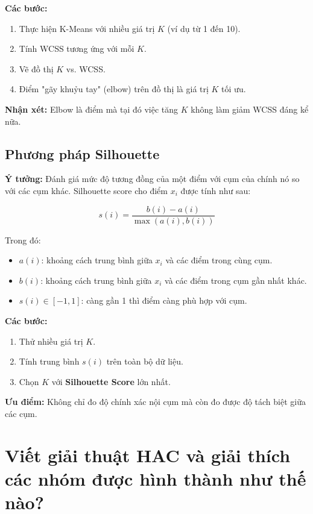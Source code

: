\documentclass[12pt]{article}
\begin{document}
	\textbf{Các bước:}
	
	\begin{enumerate}
	\item Thực hiện K-Means với nhiều giá trị $K$ (ví dụ từ 1 đến 10).
	\item Tính WCSS tương ứng với mỗi $K$.
	\item Vẽ đồ thị $K$ vs. WCSS.
	\item Điểm "gãy khuỷu tay" (elbow) trên đồ thị là giá trị $K$ tối ưu.
	\end{enumerate}
	
	\textbf{Nhận xét:} Elbow là điểm mà tại đó việc tăng $K$ không làm giảm WCSS đáng kể nữa.
	
	\subsection{Phương pháp Silhouette}
	
	\textbf{Ý tưởng:} Đánh giá mức độ tương đồng của một điểm với cụm của chính nó so với các cụm khác. Silhouette score cho điểm $x_i$ được tính như sau:
	
	\[
	s(i) = \frac{b(i) - a(i)}{\max \left( a(i), b(i) \right)}
	\]
	
	Trong đó:
	\begin{itemize}
	\item $a(i)$: khoảng cách trung bình giữa $x_i$ và các điểm trong cùng cụm.
	\item $b(i)$: khoảng cách trung bình giữa $x_i$ và các điểm trong cụm gần nhất khác.
	\item $s(i) \in [-1, 1]$: càng gần 1 thì điểm càng phù hợp với cụm.
	\end{itemize}
	
	\textbf{Các bước:}
	
	\begin{enumerate}
	\item Thử nhiều giá trị $K$.
	\item Tính trung bình $s(i)$ trên toàn bộ dữ liệu.
	\item Chọn $K$ với \textbf{Silhouette Score} lớn nhất.
	\end{enumerate}
	
	\textbf{Ưu điểm:} Không chỉ đo độ chính xác nội cụm mà còn đo được độ tách biệt giữa các cụm.
	
	\section{Viết giải thuật HAC và giải thích các nhóm được hình thành như thế nào?}
	
\end{document}

